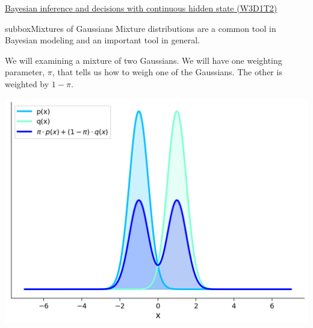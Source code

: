 \begin{textbox}{\href{https://compneuro.neuromatch.io/tutorials/W3D1_BayesianDecisions/student/W3D1_Tutorial2.html}{Bayesian inference and decisions with continuous hidden state (W3D1T2)} }
\begin{subbox}{subbox}{Mixtures of Gaussians}
Mixture distributions are a common tool in Bayesian modeling and an important tool in general.

We will examining a mixture of two Gaussians. We will have one weighting parameter, $\pi$, that tells us how to weigh one of the Gaussians. The other is weighted by $1 -\pi$. 

\begin{center}
    
\includegraphics[scale=0.22]{Figures/BD/BD_Figure7.png}
\end{center}
\end{subbox}


\end{textbox}
